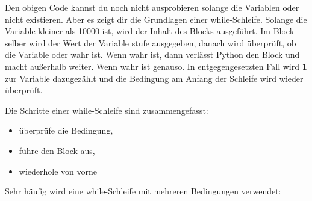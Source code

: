 Den obigen Code kannst du noch nicht ausprobieren solange die Variablen  oder  nicht existieren. Aber es zeigt dir die Grundlagen einer while-Schleife. Solange die Variable  kleiner als 10000 ist, wird der Inhalt des Blocks ausgeführt. Im Block selber wird der Wert der Variable stufe ausgegeben, danach wird überprüft, ob die Variable  oder  wahr ist. Wenn  wahr ist, dann verlässt Python den Block und macht außerhalb weiter. Wenn  wahr ist genauso. In entgegengesetzten Fall wird \textbf{1} zur Variable  dazugezählt und die Bedingung am Anfang der Schleife wird wieder überprüft.
\par
\noindent
Die Schritte einer while-Schleife sind zusammengefasst:

{\renewcommand{\labelitemi}{$\triangleright$}
\begin{itemize}
\item überprüfe die Bedingung,
\item führe den Block aus,
\item wiederhole von vorne
\end{itemize}}

Sehr häufig wird eine while-Schleife mit mehreren Bedingungen verwendet:

